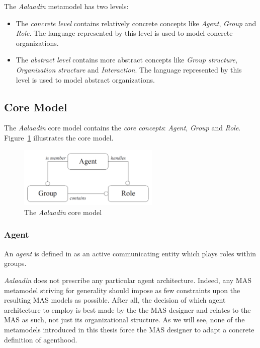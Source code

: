 The \textit{Aalaadin} metamodel has two levels:
\begin{itemize}
	\item The \textit{concrete level} contains relatively concrete concepts like \textit{Agent}, \textit{Group} and \textit{Role}.
	The language represented by this level is used to model concrete organizations.
	\item The \textit{abstract level} contains more abstract concepts like \textit{Group structure}, \textit{Organization structure} and \textit{Interaction}.
	The language represented by this level is used to model abstract organizations.
\end{itemize}

\subsection{Core Model}

The \textit{Aalaadin} core model contains the \textit{core concepts}: \textit{Agent}, \textit{Group} and \textit{Role}.
Figure~\ref{figure:aalaadin-core-model} illustrates the core model.

\begin{figure}[h]
	\centering
	\includegraphics[width=0.6\textwidth]{images/aalaadin/core-model.png}
	\caption{The \textit{Aalaadin} core model \cite{Ferber97}}
	\label{figure:aalaadin-core-model}
\end{figure}

\subsubsection*{Agent}

An \textit{agent} is defined in \cite{Ferber97} as an active communicating entity which plays roles within groups.

\textit{Aalaadin} does not prescribe any particular agent architecture.
Indeed, any MAS metamodel striving for generality should impose as few constraints upon the resulting MAS models as possible.
After all, the decision of which agent architecture to employ is best made by the the MAS designer and relates to the MAS as such, not just its organizational structure.
As we will see, none of the metamodels introduced in this thesis force the MAS designer to adapt a concrete definition of agenthood.


